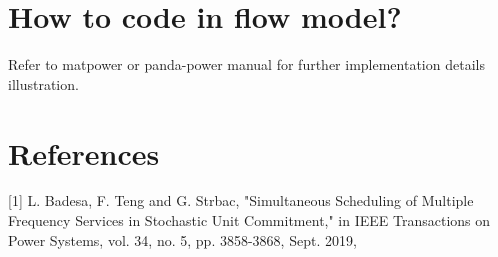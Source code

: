 \documentclass{article}
\begin{document}
\section{How to code in flow model?}
Refer to matpower or panda-power manual for further implementation details illustration.

\section*{References}

\medskip

\small

[1] L. Badesa, F. Teng and G. Strbac, "Simultaneous Scheduling of Multiple Frequency Services in Stochastic Unit Commitment," in IEEE Transactions on Power Systems, vol. 34, no. 5, pp. 3858-3868, Sept. 2019,
\end{document}
